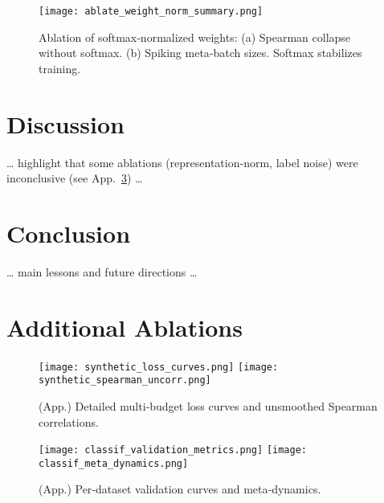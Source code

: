 \documentclass{article}
\begin{document}
\begin{figure}[t]
  \centering
  \texttt{[image: ablate\_weight\_norm\_summary.png]}
  \caption{Ablation of softmax‐normalized weights: (a) Spearman collapse without softmax. (b) Spiking meta‐batch sizes. Softmax stabilizes training.}
  \label{fig:ablation-softmax}
\end{figure}


\section{Discussion}
… highlight that some ablations (representation‐norm, label noise) were inconclusive (see App.~\ref{app:additional-ablations}) …

\section{Conclusion}
… main lessons and future directions …

\appendix
\section{Additional Ablations}
\label{app:additional-ablations}

\begin{figure}[h]
  \centering
  \texttt{[image: synthetic\_loss\_curves.png]}
  \texttt{[image: synthetic\_spearman\_uncorr.png]}
  \caption{(App.) Detailed multi‐budget loss curves and unsmoothed Spearman correlations.}
  \label{fig:synthetic-detailed}
\end{figure}

\begin{figure}[h]
  \centering
  \texttt{[image: classif\_validation\_metrics.png]}
  \texttt{[image: classif\_meta\_dynamics.png]}
  \caption{(App.) Per‐dataset validation curves and meta‐dynamics.}
  \label{fig:classif-detailed}
\end{figure}
\end{document}
